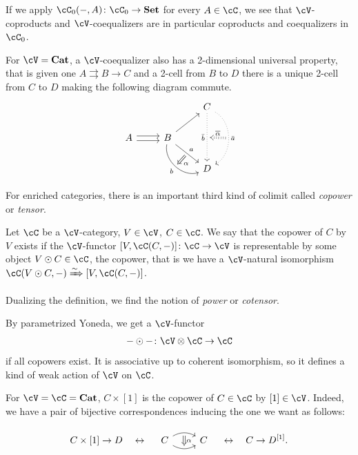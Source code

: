 \documentclass[a4paper,11pt,oneside,openany]{scrbook}
\begin{document}
\begin{rmk}
	If we apply $\cC_0(-,A)\colon\cC_0\rightarrow\Set$ for every $A\in\cC$, we see that $\cV$-coproducts and $\cV$-coequalizers are in particular coproducts and coequalizers in $\cC_0$.
\end{rmk}

\begin{exmp}
	For $\cV=\Cat$, a $\cV$-coequalizer also has a 2-dimensional universal property, that is given one $A\rightrightarrows B\rightarrow C$ and a 2-cell from $B$ to $D$ there is a unique 2-cell from $C$ to $D$ making the following diagram commute.
	\[
		\begin{tikzcd}
			&& C\ar[dd, dotted, swap, "\bar{b}", ""{name=bbar}]\ar[dd, dotted, bend left=60, "\bar{a}", ""{name=abar}] \\
			A\ar[r, shift left,]\ar[r, shift right]
			& B\ar[ur]\ar[dr, "a", ""{name=a}]\ar[dr, bend right=60, swap, "b", ""{name=b}] \\
			&& D
			\ar[Rightarrow, shorten <= .3em, shorten >= .3em, from=a, to=b, "\alpha"]
			\ar[Rightarrow, dotted, shorten <= .3em, shorten >= .3em, swap, from=abar, to=bbar, "\overline{\alpha}"]
		\end{tikzcd}
	\]
\end{exmp}

For enriched categories, there is an important third kind of colimit called \emph{copower} or \emph{tensor}.

\begin{defn}
	Let $\cC$ be a $\cV$-category, $V\in\cV$, $C\in\cC$. We say that the copower of $C$ by $V$ exists if the $\cV$-functor $[V,\cC(C,-)]\colon\cC\rightarrow\cV$ is representable by some object $V\odot C\in\cC$, the copower, that is we have a $\cV$-natural isomorphism $\cC(V\odot C,-)\xRightarrow{\sim}[V,\cC(C,-)]$.

	Dualizing the definition, we find the notion of \emph{power} or \emph{cotensor}.
\end{defn}

\begin{rmk}
	By parametrized Yoneda, we get a $\cV$-functor$$-\odot-\colon\cV\otimes\cC\rightarrow\cC$$if all copowers exist. It is associative up to coherent isomorphism, so it defines a kind of weak action of $\cV$ on $\cC$.
\end{rmk}

\begin{exmp}
	For $\cV=\cC=\Cat$, $C\times[1]$ is the copower of $C\in\cC$ by $[1]\in\cV$. Indeed, we have a pair of bijective correspondences inducing the one we want as follows:

	$$C\times[1]\rightarrow D\quad\leftrightarrow\quad
		\begin{tikzcd}
			C\ar[r, bend left, ""{name=A}]\ar[r, bend right, swap, ""{name=B}]
			& C
			\ar[Rightarrow, shorten <= .3em, shorten >= .3em, from=A, to=B, "\alpha"]
		\end{tikzcd}
		\quad\leftrightarrow\quad C\rightarrow D^{[1]}.$$
\end{exmp}
\end{document}
